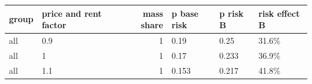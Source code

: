 \begingroup\small
\setlength{\tabcolsep}{3pt}
\renewcommand{\arraystretch}{1.04}
\begin{tabularx}{\linewidth}{XXrXXX}
\toprule
group & price and rent factor & mass share & p base risk & p risk B & risk effect B \\
\midrule
all & 0.9 & 1 & 0.19 & 0.25 & 31.6\% \\
all & 1 & 1 & 0.17 & 0.233 & 36.9\% \\
all & 1.1 & 1 & 0.153 & 0.217 & 41.8\% \\
\bottomrule
\end{tabularx}
\endgroup
